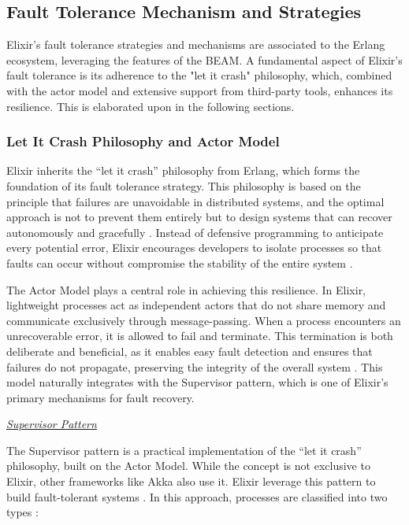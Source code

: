 \subsection{Fault Tolerance Mechanism and Strategies}

Elixir's fault tolerance strategies and mechanisms are associated to the Erlang ecosystem, leveraging the features of the \gls{BEAM}. A fundamental aspect of Elixir's fault tolerance is its adherence to the "let it crash" philosophy, which, combined with the actor model and extensive support from third-party tools, enhances its resilience. This is elaborated upon in the following sections.

\subsubsection{Let It Crash Philosophy and Actor Model}

Elixir inherits the “let it crash” philosophy from Erlang, which forms the foundation of its fault tolerance strategy. This philosophy is based on the principle that failures are unavoidable in distributed systems, and the optimal approach is not to prevent them entirely but to design systems that can recover autonomously and gracefully \cite{Armstrong2013, Kleppmann2017}. Instead of defensive programming to anticipate every potential error, Elixir encourages developers to isolate processes so that faults can occur without compromise the stability of the entire system \cite{Juric2024}.

The Actor Model plays a central role in achieving this resilience. In Elixir, lightweight processes act as independent actors that do not share memory and communicate exclusively through message-passing. When a process encounters an unrecoverable error, it is allowed to fail and terminate. This termination is both deliberate and beneficial, as it enables easy fault detection and ensures that failures do not propagate, preserving the integrity of the overall system \cite{Juric2024,Armstrong2013}. This model naturally integrates with the Supervisor pattern, which is one of Elixir’s primary mechanisms for fault recovery.

\textit{\underline{Supervisor Pattern}}

The Supervisor pattern is a practical implementation of the “let it crash” philosophy, built on the Actor Model. While the concept is not exclusive to Elixir, other frameworks like Akka also use it. Elixir leverage this pattern to build fault-tolerant systems \cite{Valkov2018}. In this approach, processes are classified into two types \cite{Juric2024}:

